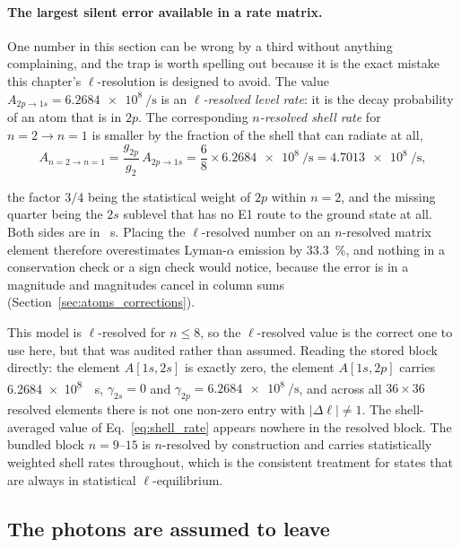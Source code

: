 \paragraph{The largest silent error available in a rate matrix.} One number in
this section can be wrong by a third without anything complaining, and the trap
is worth spelling out because it is the exact mistake this chapter's
$\ell$-resolution is designed to avoid. The value
$A_{2p\to1s} = \SI{6.2684e8}{\per\second}$ is an \emph{$\ell$-resolved level
rate}: it is the decay probability of an atom that is in $2p$. The
corresponding \emph{$n$-resolved shell rate} for $n=2 \to n=1$ is smaller by
the fraction of the shell that can radiate at all,
\begin{equation}
  A_{n=2 \to n=1}
  = \frac{g_{2p}}{g_{2}}\,A_{2p\to1s}
  = \frac{6}{8}\times\SI{6.2684e8}{\per\second}
  = \SI{4.7013e8}{\per\second},
  \label{eq:shell_rate}
\end{equation}

\noindent the factor $3/4$ being the statistical weight of $2p$ within $n=2$,
and the missing quarter being the $2s$ sublevel that has no E1 route to the
ground state at all. Both sides are in \si{\per\second}. Placing the
$\ell$-resolved number on an $n$-resolved matrix element therefore overestimates
Lyman-$\alpha$ emission by \SI{33.3}{\percent}, and nothing in a conservation
check or a sign check would notice, because the error is in a magnitude and
magnitudes cancel in column sums (Section~\ref{sec:atoms_corrections}).

This model is $\ell$-resolved for $n \le 8$, so the $\ell$-resolved value is the
correct one to use here, but that was audited rather than assumed. Reading the
stored block directly: the element $A[1s,2s]$ is exactly zero, the element
$A[1s,2p]$ carries \SI{6.2684e8}{\per\second}, $\gamma_{2s} = 0$ and
$\gamma_{2p} = \SI{6.2684e8}{\per\second}$, and across all
$36\times36$ resolved elements there is not one non-zero entry with
$|\Delta\ell| \neq 1$. The shell-averaged value of Eq.~\eqref{eq:shell_rate}
appears nowhere in the resolved block. The bundled block $n = 9$--$15$ is
$n$-resolved by construction and carries statistically weighted shell rates
throughout, which is the consistent treatment for states that are always in
statistical $\ell$-equilibrium.

\subsection{The photons are assumed to leave}
\label{sec:radiative_transfer}


